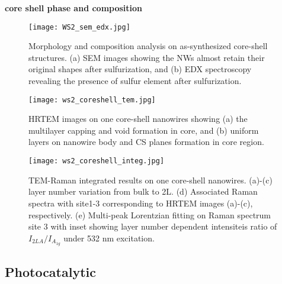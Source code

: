 \documentclass[11pt]{article} %
\providecommand*{\bibpath}{E:/spring2012/Ubuntu/Latex/Mendeley_Bib_lib}
\begin{document}
\textbf{core shell phase and composition}

\begin{figure}[htb]
\centering
\texttt{[image: WS2\_sem\_edx.jpg]}
\caption{ Morphology and composition analysis on as-synthesized core-shell structures. (a) SEM images showing the NWs almost retain their original shapes after sulfurization, and (b) EDX spectroscopy revealing the presence of sulfur element after sulfurization.}
\label{fig:ws2sem}
\end{figure}

\begin{figure}[htb]
\centering
\texttt{[image: ws2\_coreshell\_tem.jpg]}
\caption{HRTEM images on one core-shell nanowires showing (a) the multilayer capping and void formation in  core, and (b) uniform  layers on nanowire body and CS planes formation in core region.}
\label{fig:ws2tem}
\end{figure}
\begin{figure}[htb]
\centering
\texttt{[image: ws2\_coreshell\_integ.jpg]}
\caption{TEM-Raman integrated results on one core-shell nanowires. (a)-(c)  layer number variation from bulk to 2L. (d) Associated Raman spectra with site1-3 corresponding to HRTEM images (a)-(c), respectively. (e) Multi-peak Lorentzian fitting on Raman spectrum site 3 with inset showing layer number dependent intensiteis ratio of $I_{2LA}/I_{A_{1g}}$ under 532 nm excitation.}
\label{fig:ws2ram}
\end{figure}


\FloatBarrier
\subsection{Photocatalytic}



\clearpage


\end{document}
